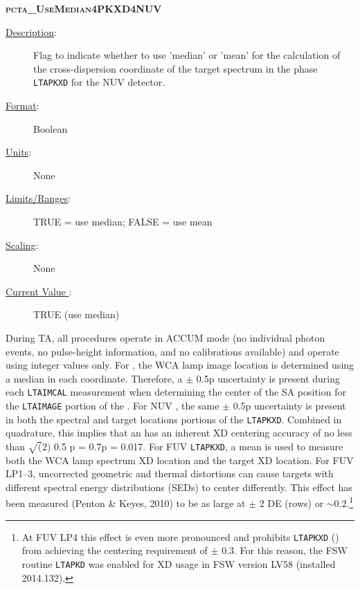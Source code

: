 \item{\textsc{\bf pcta\_UseMedian4PKXD4NUV}}
	\begin{description}
	\item[\underline{\rm Description}:]Flag to indicate whether to use 'median' or 'mean' for the calculation of the cross-dispersion coordinate of the target spectrum in the phase \texttt{LTAPKXD} for the NUV detector.
	\item[\underline{\rm Format}:]    Boolean
	\item[\underline{\rm Units}:]     None
	\item[\underline{\rm Limits/Ranges}:]  TRUE = use median;  FALSE = use mean
	\item[\underline{\rm Scaling}:]   None
	\item[\underline{\rm Current Value }:]   TRUE (use median)
\end{description}

During TA, all \tacq{} procedures operate in ACCUM mode (no individual photon events, no pulse-height information, and no calibrations available) and operate using integer values only.
For , the WCA lamp image location is determined using a median in each coordinate. Therefore, a $\pm$ 0.5p uncertainty is present during each \texttt{LTAIMCAL} measurement when determining the center of the SA position for the
\texttt{LTAIMAGE} portion of the . For NUV , the same $\pm$ 0.5p uncertainty is present in both the spectral and target locations portions of the \texttt{LTAPKXD}. Combined in quadrature, this implies that
an  has an inherent XD centering accuracy of no less than $\sqrt(2)$ 0.5 p = 0.7p = 0.017\arcsec. For FUV \texttt{LTAPKXD}, a mean is used to measure both the WCA lamp spectrum XD location and the target XD location.
For FUV LP1--3, uncorrected geometric and thermal distortions can cause targets with different spectral energy distributions (SEDs) to center differently. This effect has been measured (Penton \& Keyes, 2010) to be as large at $\pm$ 2 DE (rows) or
$\sim 0.2$\arcsec.\footnote{At FUV LP4 this effect is even more pronounced and prohibits \texttt{LTAPKXD} (\numposonenumposone {}) from achieving the centering requirement of $\pm$ 0.3\arcsec. For this reason, the  FSW routine \texttt{LTAPKD} was enabled
for XD usage in FSW version LV58 (installed 2014.132).}
